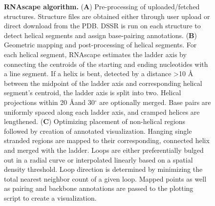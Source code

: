 \begin{center}
    \begin{figure}
        \caption[RNAscape algorithm.]{\textbf{RNAscape algorithm.} ({\bf A})  Pre-processing of uploaded/fetched structures. Structure files are obtained either through user upload or direct download from the PDB. DSSR is run on each structure to detect helical segments and assign base-pairing annotations. ({\bf B}) Geometric mapping and post-processing of helical segments. For each helical segment, RNAscape estimates the ladder axis by connecting the centroids of the starting and ending nucleotides with a line segment. If a helix is bent, detected by a distance >10 Å between the midpoint of the ladder axis and corresponding helical segment's centroid, the ladder axis is split into two. Helical projections within 20 \AA and 30$^{\circ}$ are optionally merged. Base pairs are uniformly spaced along each ladder axis, and cramped helices are lengthened. ({\bf C}) Optimizing placement of non-helical regions followed by creation of annotated visualization. Hanging single stranded regions are mapped to their corresponding, connected helix and merged with the ladder. Loops are either preferentially bulged out in a radial curve or interpolated linearly based on a spatial density threshold. Loop direction is determined by minimizing the total nearest neighbor count of a given loop. Mapped points as well as pairing and backbone annotations are passed to the plotting script to create a visualization.}
  \label{fig:rnascape3}
\end{figure}
\end{center}
